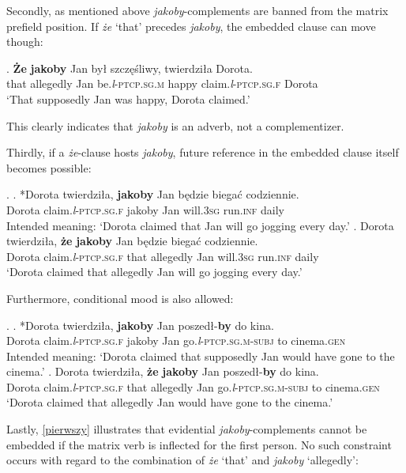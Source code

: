 \documentclass[output=paper
,modfonts
,nonflat]{langsci/langscibook}
\newcommand{\glossformat}[1]{\textsc{#1}}
\newcommand{\thirdperson}{\glossformat{3}\xspace}
\newcommand{\fem}{\glossformat{f}\xspace}
\newcommand{\gen}{\glossformat{gen}\xspace}
\newcommand{\infv}{\glossformat{inf}\xspace}
\newcommand{\lptcp}{\emph{l}\glossformat{-ptcp}\xspace}
\newcommand{\masc}{\glossformat{m}\xspace}
\newcommand{\sg}{\glossformat{sg}\xspace}
\newcommand{\subj}{\glossformat{subj}\xspace}
\begin{document}
\noindent  Secondly, as mentioned above \emph{jakoby}-complements are banned from the matrix prefield position. If \emph{że} `that' precedes \emph{jakoby}, the embedded clause can move though: 

\exg.		\textbf{Że} \textbf{jakoby} Jan był szczęśliwy, twierdziła Dorota. \\  
		 that allegedly Jan be.{\lptcp}.{\sg}.{\masc} happy  claim.{\lptcp}.{\sg}.{\fem} Dorota \\
		`That supposedly Jan was happy, Dorota claimed.' 

This clearly indicates that \emph{jakoby} is an adverb, not a complementizer. 

\noindent  Thirdly, if a \emph{że}-clause hosts \emph{jakoby}, future reference in the embedded clause itself becomes possible: 

\ex.	\ag. 	*Dorota twierdziła, \textbf{jakoby} Jan będzie biegać codziennie. \\
		Dorota claim.{\lptcp}.{\sg}.{\fem} jakoby Jan will.{\thirdperson}{\sg} run.{\infv} daily \\
		Intended meaning: `Dorota claimed that Jan will go jogging every day.'
	\bg.	Dorota twierdziła, \textbf{że} \textbf{jakoby} Jan będzie biegać codziennie. \\
		Dorota claim.{\lptcp}.{\sg}.{\fem} that allegedly Jan will.{\thirdperson}{\sg} run.{\infv} daily \\
		`Dorota claimed that allegedly Jan will go jogging every day.'

\noindent  Furthermore, conditional mood is also allowed:

\ex.	\ag.		*Dorota twierdziła, \textbf{jakoby} Jan poszedł-\textbf{by} do kina. \\
 			Dorota claim.{\lptcp}.{\sg}.{\fem} jakoby Jan go.{\lptcp}.{\sg}.{\masc}-{\subj} to cinema.{\gen} \\
			Intended meaning: `Dorota claimed that supposedly Jan would have gone to the cinema.' 
	\bg.		Dorota twierdziła, \textbf{że} \textbf{jakoby} Jan poszedł-\textbf{by} do kina. \\
 			Dorota claim.{\lptcp}.{\sg}.{\fem} that allegedly Jan go.{\lptcp}.{\sg}.{\masc}-{\subj} to cinema.{\gen} \\
			`Dorota claimed that allegedly Jan would have gone to the cinema.'

\noindent  Lastly, \ref{pierwszy} illustrates that evidential \emph{jakoby}-complements cannot be embedded if the matrix verb is inflected for the first person. No such constraint occurs with regard to the combination of \emph{że} `that' and \emph{jakoby} `allegedly': 
\end{document}
